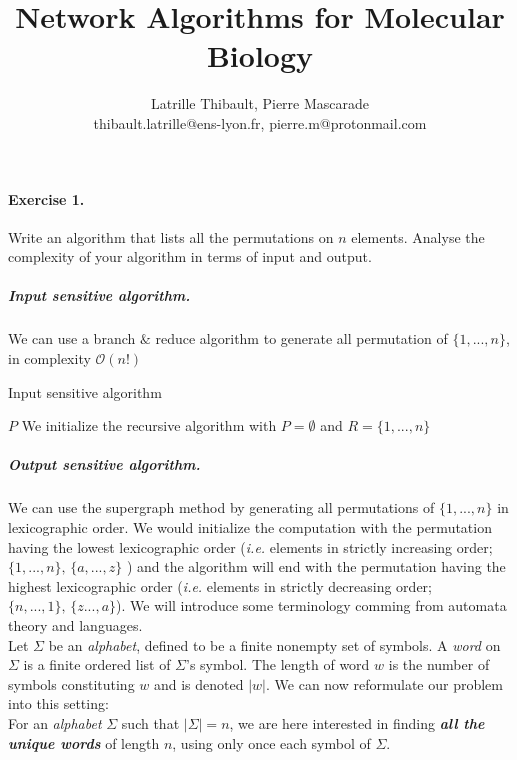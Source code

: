 \documentclass{article}
\author{Latrille Thibault, Pierre Mascarade\\
\small thibault.latrille@ens-lyon.fr, pierre.m@protonmail.com}
\title{Network Algorithms for Molecular Biology}
\begin{document}
\maketitle
\paragraph{Exercise 1. }
Write an algorithm that lists all the permutations on $n$ elements. Analyse the complexity of your algorithm in terms of input and output.
\
\subparagraph{Input sensitive algorithm.\\}
We can use a branch $\&$ reduce algorithm to generate all permutation of $\{1, ..., n\}$, in complexity $\mathcal{O} (n !)$\

\begin{algorithm}
\caption{Input sensitive algorithm}
\begin{algorithmic}[1]
\If {$|R| = 0$} 
\State \Return $P$
\Else
		\State {}
	\EndFor
\EndIf
\EndFunction
\State We initialize the recursive algorithm with $ P = \emptyset$ and $ R = \{1, ..., n\} $
\State \Call{permutations}{$\emptyset$, $\{1, ..., n\}$}
\end{algorithmic}
\end{algorithm}
\subparagraph{Output sensitive algorithm.\\}
We can use the supergraph method by generating all permutations of $\{1, ..., n\}$ in lexicographic order. We would initialize the computation with the permutation having the lowest lexicographic order (\textit{i.e.} elements in strictly increasing order; $\{1, ..., n\}\text{, }\{a, ..., z\}$ ) and the algorithm will end with the permutation having the highest lexicographic order (\textit{i.e.} elements in strictly decreasing order; $\{n, ..., 1\}\text{, }\{z ..., a\}$). We will introduce some terminology comming from automata theory and languages. \\
Let $\Sigma$ be an \textit{alphabet}, defined to be a finite nonempty set of symbols. A \textit{word} on $\Sigma$ is a finite ordered list of $\Sigma$'s symbol. The length of word $w$ is the number of symbols constituting $w$ and is denoted $|w|$. We can now reformulate our problem into this setting:\\
For an \textit{alphabet} $\Sigma$ such that $|\Sigma| = n $, we are here interested in finding \textbf{\textit{all the unique words}} of length $n$, using only once each symbol of $\Sigma$.
\end{document}
